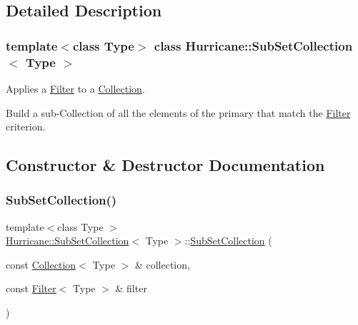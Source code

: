 \subsection{Detailed Description}
\subsubsection*{template$<$class Type$>$\newline
class Hurricane\+::\+Sub\+Set\+Collection$<$ Type $>$}

Applies a \mbox{\hyperlink{classHurricane_1_1Filter}{Filter}} to a \mbox{\hyperlink{classHurricane_1_1Collection}{Collection}}. 

Build a sub-\/\+Collection of all the elements of the primary that match the \mbox{\hyperlink{classHurricane_1_1Filter}{Filter}} criterion. 

\subsection{Constructor \& Destructor Documentation}
\mbox{\label{classHurricane_1_1SubSetCollection_a6da1f511e27351cdc8b56bda7fbc44e8}} 
\subsubsection{\texorpdfstring{Sub\+Set\+Collection()}{SubSetCollection()}\hspace{0.1cm}{\footnotesize\ttfamily [1/2]}}
{\footnotesize\ttfamily template$<$class Type $>$ \\
\mbox{\hyperlink{classHurricane_1_1SubSetCollection}{Hurricane\+::\+Sub\+Set\+Collection}}$<$ Type $>$\+::\mbox{\hyperlink{classHurricane_1_1SubSetCollection}{Sub\+Set\+Collection}} (\begin{DoxyParamCaption}\item[{const \mbox{\hyperlink{classHurricane_1_1Collection}{Collection}}$<$ Type $>$ \&}]{collection,  }\item[{const \mbox{\hyperlink{classHurricane_1_1Filter}{Filter}}$<$ Type $>$ \&}]{filter }\end{DoxyParamCaption})\hspace{0.3cm}{\ttfamily [inline]}}

